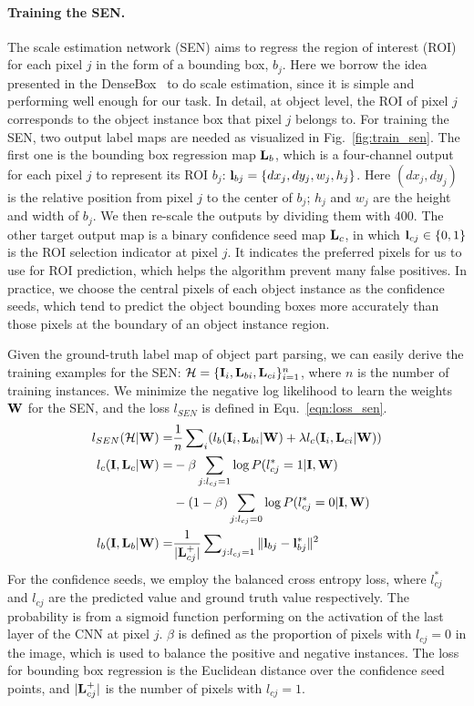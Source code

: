 \paragraph{\textbf{Training the SEN.}}
The scale estimation network (SEN) aims to regress the region of interest (ROI) for each pixel $j$ in the form of a bounding box, $b_j$.
Here we borrow the idea presented in the DenseBox~\cite{huang2015densebox} to do scale estimation, since it is simple and performing well enough for our task. 
In detail, at object level, the ROI of pixel $j$ corresponds to the object instance box that pixel $j$ belongs to. For training the SEN,
two output label maps are needed as visualized in Fig.~\ref{fig:train_sen}. The first one is the bounding box regression map ${\mathbf L}_{b}$,
which is a four-channel output for each pixel $j$ to represent its ROI $b_j$: ${\mathbf l}_{bj}=\{dx_j, dy_j, w_j, h_j\}$.
Here $(dx_j, dy_j)$ is the relative position from pixel $j$ to the center of $b_j$; $h_j$ and $w_j$ are the height and width of $b_j$.
We then re-scale the outputs by dividing them with $400$. 
The other target output map is a binary confidence seed map ${\mathbf L}_{c}$, in which ${\mathbf l}_{cj}\in\{0,1\}$ is the ROI selection indicator at pixel $j$.
It indicates the preferred pixels for us to use for ROI prediction, which helps the algorithm prevent many false positives.
In practice, we choose the central pixels of each object instance as the confidence seeds,
which tend to predict the object bounding boxes more accurately than those pixels at the boundary of an object instance region. 

Given the ground-truth label map of object part parsing, we can easily derive the training examples for the SEN:
${\mathcal H} = \{{\mathbf I}_i, {\mathbf L}_{bi}, {\mathbf L}_{ci}\}_{i=1}^{n}$, where $n$ is the number of training instances.
We minimize the negative log likelihood to learn the weights ${\mathbf W}$ for the SEN, and the loss $l_{SEN}$ is defined in Equ.~\ref{eqn:loss_sen}.
\begin{align}
\label{eqn:loss_sen}
l_{SEN}({\mathcal H}|{\mathbf W}) =& \frac{1}{n}\sum\nolimits_{i}(l_{b}({\mathbf I}_i, {\mathbf L}_{bi} | {\mathbf W}) + \lambda l_{c}({\mathbf I}_i, {\mathbf L}_{ci} | {\mathbf W})) \nonumber\\
l_{c}({\mathbf I}, {\mathbf L}_{c}|{\mathbf W}) =& -\beta\sum\limits_{j:l_{cj}=1} \log P(l_{cj}^*=1|{\mathbf I}, {\mathbf W}) \nonumber \\
                                  & -(1-\beta)\sum\limits_{j:l_{cj}=0}\log P(l_{cj}^*=0|{\mathbf I}, {\mathbf W}) \\
l_{b}({\mathbf I}, {\mathbf L}_{b}|{\mathbf W}) =& \frac{1}{|{\mathbf L}_{cj}^+|}\sum\nolimits_{j:l_{cj}=1}\|{\mathbf l}_{bj}-{\mathbf l}_{bj}^*\|^2 \nonumber
\end{align}
For the confidence seeds, we employ the balanced cross entropy loss, where $l_{cj}^*$ and $l_{cj}$ are the predicted value and ground truth value respectively. The probability is from a sigmoid function performing on the activation of the last layer of the CNN at pixel $j$.  $\beta$ is defined as the proportion of pixels with $l_{cj}=0$ in the image, which is used to balance the positive and negative instances. The loss for bounding box regression is the Euclidean distance over the confidence seed points, and $|{\mathbf L}_{cj}^+|$ is the number of pixels with $l_{cj}=1$.

